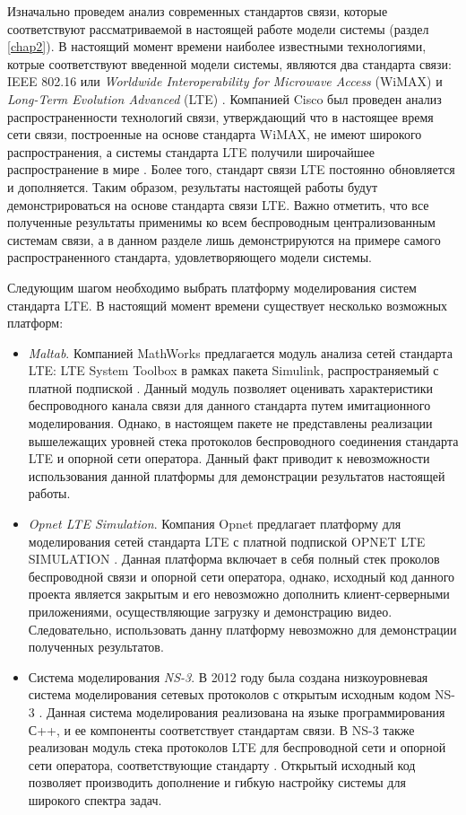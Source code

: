 Изначально проведем анализ современных стандартов связи, которые соответствуют рассматриваемой в настоящей работе модели системы (раздел \ref{chap2}). В настоящий момент времени наиболее известными технологиями, котрые соответствуют введенной модели системы, являются два стандарта связи: IEEE 802.16 или \textit{Worldwide Interoperability for Microwave Access} (WiMAX) \cite{wimax_std} и \textit{Long-Term Evolution Advanced} (LTE) \cite{lte_std}. Компанией Cisco был проведен анализ распространенности технологий связи, утверждающий что в настоящее время сети связи, построенные на основе стандарта WiMAX, не имеют широкого распространения, а системы стандарта LTE получили широчайшее распространение в мире \cite{Cisco}. Более того, стандарт связи LTE постоянно обновляется и дополняется. Таким образом, результаты настоящей работы будут демонстрироваться на основе стандарта связи LTE. Важно отметить, что все полученные результаты применимы ко всем беспроводным централизованным системам связи, а в данном разделе лишь демонстрируются на примере самого распространенного стандарта, удовлетворяющего модели системы.

Следующим шагом необходимо выбрать платформу моделирования систем стандарта LTE. В настоящий момент времени существует несколько возможных платформ:
\begin{itemize}
	\item \textit{Maltab}. Компанией MathWorks предлагается модуль анализа сетей стандарта LTE: LTE System Toolbox в рамках пакета Simulink, распространяемый с платной подпиской \cite{Matlab}. Данный модуль позволяет оценивать характеристики беспроводного канала связи для данного стандарта путем имитационного моделирования. Однако, в настоящем пакете не представлены реализации вышележащих уровней стека протоколов беспроводного соединения стандарта LTE и опорной сети оператора. Данный факт приводит к невозможности использования данной платформы для демонстрации результатов настоящей работы.
	\item \textit{Opnet LTE Simulation}. Компания Opnet предлагает платформу для моделирования сетей стандарта LTE с платной подпиской OPNET LTE SIMULATION \cite{Opnet}. Данная платформа включает в себя полный стек проколов беспроводной связи и опорной сети оператора, однако, исходный код данного проекта является закрытым и его невозможно дополнить клиент-серверными приложениями, осуществляющие загрузку и демонстрацию видео. Следовательно, использовать данну платформу невозможно для демонстрации полученных результатов.
	\item Система моделирования \textit{NS-3}. В 2012 году была создана низкоуровневая система моделирования сетевых протоколов с открытым исходным кодом NS-3 \cite{ns-3}. Данная система моделирования реализована на языке программирования С++, и ее компоненты соответствует стандартам связи. В NS-3 также реализован модуль стека протоколов LTE для беспроводной сети и опорной сети оператора, соответствующие стандарту \cite{lte_std}. Открытый исходный код позволяет производить дополнение и гибкую настройку системы для широкого спектра задач.
\end{itemize}

